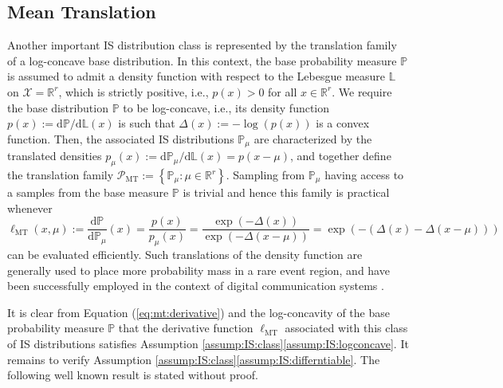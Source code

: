 \documentclass[11pt,a4paper]{article}
\theoremstyle{definition}
\DeclareMathOperator*{\MT}{MT}
\newcommand{\set}[2]{\left\{ #1 : #2 \right\}}
\renewcommand{\tfrac}[2]{#1/#2}
\renewcommand{\Re}{\mathbb R}
\newcommand{\mc}{\mathcal}
\newcommand{\mb}{\mathbb}
\renewcommand{\d}{{\mathrm d}}
\newcommand{\defn}{:=}
\begin{document}



\subsection{Mean Translation}
\label{sec:example:MT}

Another important IS distribution class is represented by the translation family of a log-concave base distribution.
In this context, the base probability measure $\mb P$ is assumed to admit a density function with respect to the Lebesgue measure $\mb L$ on $\mc X = \Re^r$, which is strictly positive, i.e., $p(x)>0$ for all $x\in \Re^r$. We require the base distribution $\mb P$ to be log-concave, i.e., its density function $p(x) \defn \tfrac{\d \mb P}{\d \mb L}(x)$ is such that $\Delta(x) := -\log(p(x))$ is a convex function.
Then, the associated IS distributions $\mathbb P_\mu$ are characterized by the translated densities $p_\mu(x) \defn \tfrac{\d \mb P_\mu}{\d \mb L}(x) = p(x-\mu)$, and together define the translation family $\mc P_{\MT}\defn \set{\mathbb P_\mu}{\mu\in \mathbb R^r}$. Sampling from $\mathbb P_\mu$  having access to a samples from the base measure $\mb P$ is trivial and hence this family is practical whenever
\begin{equation}
  \label{eq:mt:derivative}
  \ell_{\MT}(x, \mu) \defn \frac{\d \mb P}{\d \mb P_\mu}(x) = \frac{p(x)}{p_\mu(x)} = \frac{\exp(-\Delta(x))}{\exp(-\Delta(x-\mu))}=\exp(-(\Delta(x)-\Delta(x-\mu)))
\end{equation}
can be evaluated efficiently. Such translations of the density function are generally used to place more probability mass in a rare event region, and have been successfully employed in the context of digital communication systems \cite{bucklew2004introduction}.

It is clear from Equation (\ref{eq:mt:derivative}) and the log-concavity of the base probability measure $\mb P$ that the derivative function $\ell_{\MT}$ associated with this class of IS distributions satisfies Assumption \ref{assump:IS:class}\ref{assump:IS:logconcave}.
It remains to verify Assumption \ref{assump:IS:class}\ref{assump:IS:differntiable}. The following well known result is stated without proof.
\end{document}

